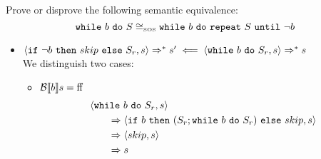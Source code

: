 \begin{exercise}{
    Prove or disprove the following semantic equivalence:
    \[ \texttt{while}\ b\ \texttt{do}\ S \cong_{\text{\tiny SOS}} \texttt{while}\ b\ \texttt{do}\ \texttt{repeat}\ S\ \texttt{until}\ \neg b  \]\vspace*{-0.6cm}
}
\begin{itemize}
\begin{itemize}
\begin{gather*}
\begin{align*}
                    \end{align*}
                \end{gather*}
                \item $\Bool{ b} s = \text{tt}$
                \[
                    \instr{\wif{\neg b}{skip}{S_r}}{s}
                    \Rightarrow
                    \instr{S_r}{s}
                    \Rightarrow^* s'
                \]
                By the termination lemma $\Bool{ \neg b} s' = tt$ \\
                $\implies \Bool{ b} s' = ff$
                \begin{align*}
                    &\instr{\wwhile{b}{S}_r}{s}
                    \\&\qquad\Rightarrow \instr{\wif{b}{(S_r; \wwhile{b}{S_r})}{skip}}{s}
                    \\&\qquad\Rightarrow \instr{S_r; \wwhile{b}{S}_r}{s}
                    \\&\text{(By composition lemma)}
                    \\&\qquad\Rightarrow^* \instr{\wwhile{b}{S}_r}{s'}
                    \\&\qquad\Rightarrow \instr{\wif{b}{(S_r; \wwhile{b}{S_r})}{skip}}{s'}
                    \\&\qquad\Rightarrow \instr{skip}{s'}
                    \\&\qquad\Rightarrow s'
                \end{align*}
            \end{itemize}
        \item $\left<\texttt{if}\ \neg b\ \texttt{then}\ skip\ \texttt{else}\ S_r, s\right> \Rightarrow^* s' \impliedby \left<\texttt{while}\ b\ \texttt{do}\ S_r, s\right> \Rightarrow^* s$ \\
            We distinguish two cases:\begin{itemize}
                \item $\mathcal{B} \llbracket  b \rrbracket s = \text{ff}$
                \begin{gather*}
                    \begin{align*}
                        &\instr{\wwhile{b}{S}_r}{s}
                        \\&\qquad\Rightarrow \instr{\wif{b}{(S_r; \wwhile{b}{S_r})}{skip}}{s}
                        \\&\qquad\Rightarrow \instr{skip}{s}
                        \\&\qquad\Rightarrow s
                    \end{align*}
                    \\

\end{gather*}
\end{itemize}
\end{itemize}
\end{exercise}
